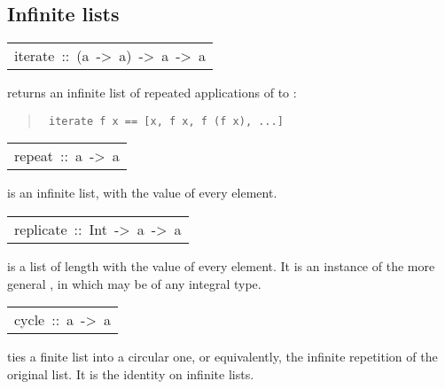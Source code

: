 \subsection{Infinite lists
}
\begin{haddockdesc}
\item[\begin{tabular}{@{}l}
iterate\ ::\ (a\ ->\ a)\ ->\ a\ ->\ {\char 91}a{\char 93}
\end{tabular}]\haddockbegindoc
{}  returns an infinite list of repeated applications
 of  to :
\par
\begin{quote}
{\haddockverb\begin{verbatim}
 iterate f x == [x, f x, f (f x), ...]
\end{verbatim}}
\end{quote}

\end{haddockdesc}
\begin{haddockdesc}
\item[\begin{tabular}{@{}l}
repeat\ ::\ a\ ->\ {\char 91}a{\char 93}
\end{tabular}]\haddockbegindoc
{}  is an infinite list, with  the value of every element.
\par

\end{haddockdesc}
\begin{haddockdesc}
\item[\begin{tabular}{@{}l}
replicate\ ::\ Int\ ->\ a\ ->\ {\char 91}a{\char 93}
\end{tabular}]\haddockbegindoc
{}  is a list of length  with  the value of
 every element.
 It is an instance of the more general ,
 in which  may be of any integral type.
\par

\end{haddockdesc}
\begin{haddockdesc}
\item[\begin{tabular}{@{}l}
cycle\ ::\ {\char 91}a{\char 93}\ ->\ {\char 91}a{\char 93}
\end{tabular}]\haddockbegindoc
{} ties a finite list into a circular one, or equivalently,
 the infinite repetition of the original list.  It is the identity
 on infinite lists.
\par

\end{haddockdesc}
